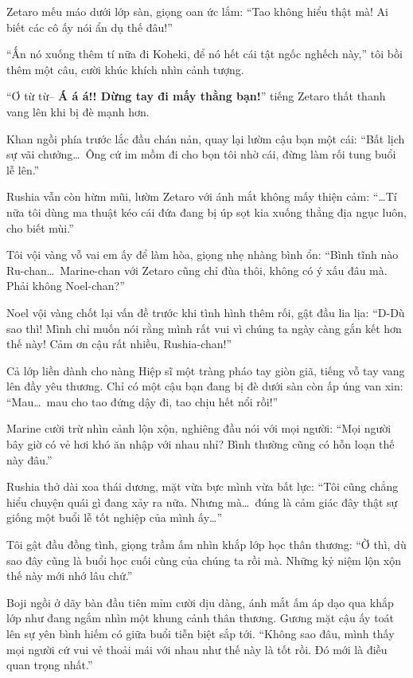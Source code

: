 \documentclass[../main.tex]{subfiles}
\begin{document}
Zetaro mếu máo dưới lớp sàn, giọng oan ức lắm: ``Tao không hiểu thật mà! Ai biết các cô ấy nói ẩn dụ thế đâu!''

``Ấn nó xuống thêm tí nữa đi Koheki, để nó hết cái tật ngốc nghếch này,'' tôi bồi thêm một câu, cười khúc khích nhìn cảnh tượng.

``Ơ từ từ-- \textbf{Á á á!! Dừng tay đi mấy thằng bạn!}'' tiếng Zetaro thất thanh vang lên khi bị đè mạnh hơn.

Khan ngồi phía trước lắc đầu chán nản, quay lại lườm cậu bạn một cái: ``Bất lịch sự vãi chưởng\dots\ Ông cứ im mồm đi cho bọn tôi nhờ cái, đừng làm rối tung buổi lễ lên.''

Rushia vẫn còn hừm mũi, lườm Zetaro với ánh mắt không mấy thiện cảm: ``\dots Tí nữa tôi dùng ma thuật kéo cái đứa đang bị úp sọt kia xuống thẳng địa ngục luôn, cho biết mùi.''

Tôi vội vàng vỗ vai em ấy để làm hòa, giọng nhẹ nhàng bình ổn: ``Bình tĩnh nào Ru-chan\dots\ Marine-chan với Zetaro cũng chỉ đùa thôi, không có ý xấu đâu mà. Phải không Noel-chan?''

Noel vội vàng chốt lại vấn đề trước khi tình hình thêm rối, gật đầu lia lịa: ``D-Dù sao thì! Mình chỉ muốn nói rằng mình rất vui vì chúng ta ngày càng gắn kết hơn thế này! Cảm ơn cậu rất nhiều, Rushia-chan!''

Cả lớp liền dành cho nàng Hiệp sĩ một tràng pháo tay giòn giã, tiếng vỗ tay vang lên đầy yêu thương. Chỉ có một cậu bạn đang bị đè dưới sàn còn ấp úng van xin: ``Mau\dots\ mau cho tao đứng dậy đi, tao chịu hết nổi rồi!''

Marine cười trừ nhìn cảnh lộn xộn, nghiêng đầu nói với mọi người: ``Mọi người bây giờ có vẻ hơi khó ăn nhập với nhau nhỉ? Bình thường cũng có hỗn loạn thế này đâu.''

Rushia thở dài xoa thái dương, mặt vừa bực mình vừa bất lực: ``Tôi cũng chẳng hiểu chuyện quái gì đang xảy ra nữa. Nhưng mà\dots\ đúng là cảm giác đây thật sự giống một buổi lễ tốt nghiệp của mình ấy\dots''

Tôi gật đầu đồng tình, giọng trầm ấm nhìn khắp lớp học thân thương: ``Ờ thì, dù sao đây cũng là buổi học cuối cùng của chúng ta rồi mà. Những kỷ niệm lộn xộn thế này mới nhớ lâu chứ.''

Boji ngồi ở dãy bàn đầu tiên mỉm cười dịu dàng, ánh mắt ấm áp dạo qua khắp lớp như đang ngắm nhìn một khung cảnh thân thương. Gương mặt cậu ấy toát lên sự yên bình hiếm có giữa buổi tiễn biệt sắp tới. ``Không sao đâu, mình thấy mọi người cứ vui vẻ thoải mái với nhau như thế này là tốt rồi. Đó mới là điều quan trọng nhất.''
\end{document}
